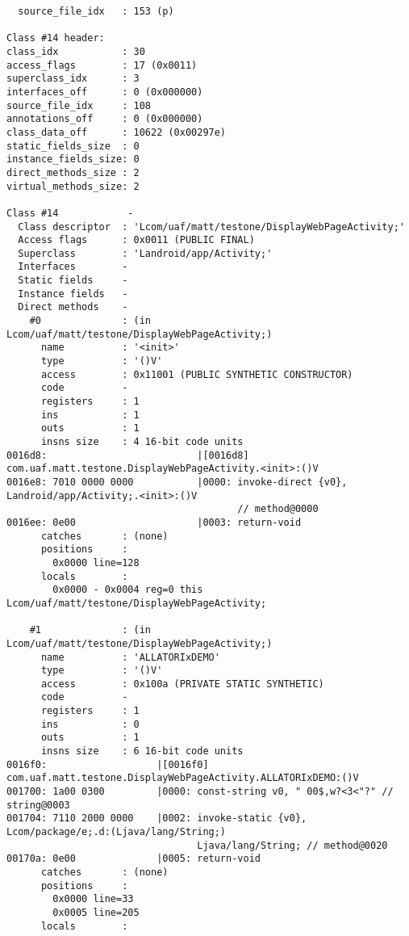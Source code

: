 \begin{lstlisting}
  source_file_idx   : 153 (p)

Class #14 header:
class_idx           : 30
access_flags        : 17 (0x0011)
superclass_idx      : 3
interfaces_off      : 0 (0x000000)
source_file_idx     : 108
annotations_off     : 0 (0x000000)
class_data_off      : 10622 (0x00297e)
static_fields_size  : 0
instance_fields_size: 0
direct_methods_size : 2
virtual_methods_size: 2

Class #14            -
  Class descriptor  : 'Lcom/uaf/matt/testone/DisplayWebPageActivity;'
  Access flags      : 0x0011 (PUBLIC FINAL)
  Superclass        : 'Landroid/app/Activity;'
  Interfaces        -
  Static fields     -
  Instance fields   -
  Direct methods    -
    #0              : (in Lcom/uaf/matt/testone/DisplayWebPageActivity;)
      name          : '<init>'
      type          : '()V'
      access        : 0x11001 (PUBLIC SYNTHETIC CONSTRUCTOR)
      code          -
      registers     : 1
      ins           : 1
      outs          : 1
      insns size    : 4 16-bit code units
0016d8:                          |[0016d8] com.uaf.matt.testone.DisplayWebPageActivity.<init>:()V
0016e8: 7010 0000 0000           |0000: invoke-direct {v0}, Landroid/app/Activity;.<init>:()V
                                        // method@0000
0016ee: 0e00                     |0003: return-void
      catches       : (none)
      positions     :
        0x0000 line=128
      locals        :
        0x0000 - 0x0004 reg=0 this Lcom/uaf/matt/testone/DisplayWebPageActivity;

    #1              : (in Lcom/uaf/matt/testone/DisplayWebPageActivity;)
      name          : 'ALLATORIxDEMO'
      type          : '()V'
      access        : 0x100a (PRIVATE STATIC SYNTHETIC)
      code          -
      registers     : 1
      ins           : 0
      outs          : 1
      insns size    : 6 16-bit code units
0016f0:                   |[0016f0] com.uaf.matt.testone.DisplayWebPageActivity.ALLATORIxDEMO:()V
001700: 1a00 0300         |0000: const-string v0, "	00$,w?<3<"?" // string@0003
001704: 7110 2000 0000    |0002: invoke-static {v0}, Lcom/package/e;.d:(Ljava/lang/String;)
                                 Ljava/lang/String; // method@0020
00170a: 0e00              |0005: return-void
      catches       : (none)
      positions     :
        0x0000 line=33
        0x0005 line=205
      locals        :


\end{lstlisting}
